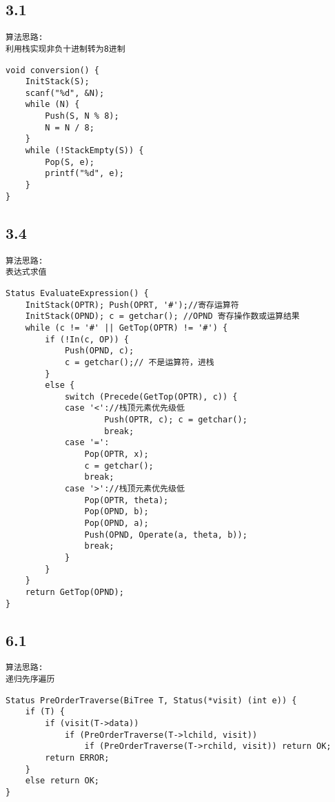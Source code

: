 \subsection{3.1}
\begin{lstlisting}[basicstyle=\small\ttfamily, caption={}, numbers=none]
算法思路:
利用栈实现非负十进制转为8进制
\end{lstlisting}
\begin{lstlisting}[basicstyle=\small\ttfamily, caption={}, numbers=none]
void conversion() {
	InitStack(S);
	scanf("%d", &N);
	while (N) {
		Push(S, N % 8);
		N = N / 8;
	}
	while (!StackEmpty(S)) {
		Pop(S, e);
		printf("%d", e);
	}
}
\end{lstlisting}


\subsection{3.4}
\begin{lstlisting}[basicstyle=\small\ttfamily, caption={}, numbers=none]
算法思路:
表达式求值
\end{lstlisting}
\begin{lstlisting}[basicstyle=\small\ttfamily, caption={}, numbers=none]
Status EvaluateExpression() {
	InitStack(OPTR); Push(OPRT, '#');//寄存运算符
	InitStack(OPND); c = getchar(); //OPND 寄存操作数或运算结果
	while (c != '#' || GetTop(OPTR) != '#') {
		if (!In(c, OP)) {
			Push(OPND, c);
			c = getchar();// 不是运算符，进栈
		}
		else {
			switch (Precede(GetTop(OPTR), c)) {
			case '<'://栈顶元素优先级低
					Push(OPTR, c); c = getchar();
					break;
			case '=':
				Pop(OPTR, x);
				c = getchar();
				break;
			case '>'://栈顶元素优先级低
				Pop(OPTR, theta);
				Pop(OPND, b);
				Pop(OPND, a);
				Push(OPND, Operate(a, theta, b));
				break;
			}
		}
	}
	return GetTop(OPND);
}
\end{lstlisting}

\subsection{6.1}
\begin{lstlisting}[basicstyle=\small\ttfamily, caption={}, numbers=none]
算法思路:
递归先序遍历
\end{lstlisting}
\begin{lstlisting}[basicstyle=\small\ttfamily, caption={}, numbers=none]
Status PreOrderTraverse(BiTree T, Status(*visit) (int e)) {
	if (T) {
		if (visit(T->data))
			if (PreOrderTraverse(T->lchild, visit))
				if (PreOrderTraverse(T->rchild, visit)) return OK;
		return ERROR;
	}
	else return OK;	
}
\end{lstlisting}


